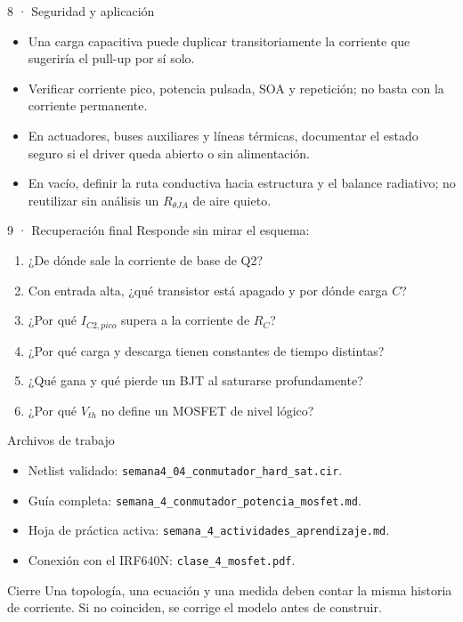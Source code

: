 \documentclass[aspectratio=169]{beamer}
\begin{document}
\begin{frame}{8 · Seguridad y aplicación}
  \begin{itemize}
    \item Una carga capacitiva puede duplicar transitoriamente la corriente que
      sugeriría el pull-up por sí solo.
    \item Verificar corriente pico, potencia pulsada, SOA y repetición; no basta
      con la corriente permanente.
    \item En actuadores, buses auxiliares y líneas térmicas, documentar el estado
      seguro si el driver queda abierto o sin alimentación.
    \item En vacío, definir la ruta conductiva hacia estructura y el balance
      radiativo; no reutilizar sin análisis un $R_{\theta JA}$ de aire quieto.
  \end{itemize}
\end{frame}

\begin{frame}{9 · Recuperación final}
  Responde sin mirar el esquema:
  \begin{enumerate}
    \item ¿De dónde sale la corriente de base de Q2?
    \item Con entrada alta, ¿qué transistor está apagado y por dónde carga $C$?
    \item ¿Por qué $I_{C2,pico}$ supera a la corriente de $R_C$?
    \item ¿Por qué carga y descarga tienen constantes de tiempo distintas?
    \item ¿Qué gana y qué pierde un BJT al saturarse profundamente?
    \item ¿Por qué $V_{th}$ no define un MOSFET de nivel lógico?
  \end{enumerate}
\end{frame}

\begin{frame}{Archivos de trabajo}
  \begin{itemize}
    \item Netlist validado: \texttt{semana4\_04\_conmutador\_hard\_sat.cir}.
    \item Guía completa: \texttt{semana\_4\_conmutador\_potencia\_mosfet.md}.
    \item Hoja de práctica activa:
      \texttt{semana\_4\_actividades\_aprendizaje.md}.
    \item Conexión con el IRF640N: \texttt{clase\_4\_mosfet.pdf}.
  \end{itemize}
  \begin{block}{Cierre}
    Una topología, una ecuación y una medida deben contar la misma historia de
    corriente. Si no coinciden, se corrige el modelo antes de construir.
  \end{block}
\end{frame}
\end{document}
